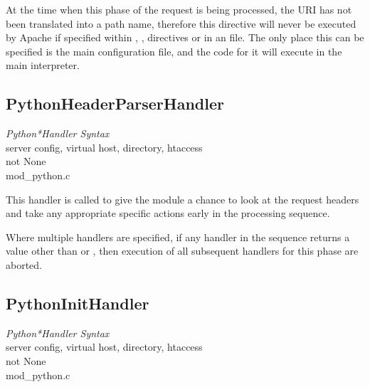 \begin{notice}
  At the time when this phase of the request is being processed, the
  URI has not been translated into a path name, therefore this
  directive will never be executed by Apache if specified within
  , ,  directives or
  in an  file. The only place this can be specified is
  the main configuration file, and the code for it will execute in the
  main interpreter.
\end{notice}

\subsection{PythonHeaderParserHandler\label{dir-handlers-hph}}

\emph{Python*Handler Syntax}\\
server config, virtual host, directory, htaccess\\
not None\\
mod_python.c

This handler is called to give the module a chance to look at the
request headers and take any appropriate specific actions early in the
processing sequence.

Where multiple handlers are specified, if any handler in the sequence
returns a value other than  or , then
execution of all subsequent handlers for this phase are aborted.

\subsection{PythonInitHandler\label{dir-handlers-pih}}

\emph{Python*Handler Syntax}\\
server config, virtual host, directory, htaccess\\
not None\\
mod_python.c

